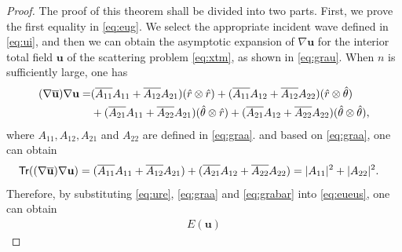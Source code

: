 \documentclass[11pt,reqno,twoside]{amsart}
\theoremstyle{definition}
\theoremstyle{remark}
\numberwithin{equation}{section}
\newcommand{\bu}{\mathbf{u}}
\newcommand{\bx}{\mathbf{x}}
\begin{document}
			\begin{proof}
				The proof of this theorem shall be divided into two parts.
				First, we prove the first equality in \eqref{eq:eug}.
				We select the appropriate incident wave defined in \eqref{eq:ui}, and then we can obtain the asymptotic expansion of $\nabla \bu$ for the interior total field $\bu$ of the scattering problem \eqref{eq:xtm}, as shown in \eqref{eq:grau}. When $n$ is sufficiently large, one has 
				\begin{align}\label{eq:graugrau}
					(\nabla \overline{\bu} )\nabla \bu
					=&(\overline{A_{11} }A_{11}+\overline{A_{12} }A_{21}) (\hat{r} \otimes \hat{r })+(\overline{A_{11} }A_{12}+\overline{A_{12} }A_{22} ) (\hat{r} \otimes \hat{\theta })\\
					&+(\overline{A_{21} }A_{11} +\overline{A_{22} }A_{21} )(\hat{\theta} \otimes \hat{r })+(\overline{A_{21} }A_{12} +\overline{A_{22} }A_{22})(\hat{\theta} \otimes \hat{\theta}),\notag
				\end{align}
				where $A_{11}, A_{12}, A_{21} $ and $A_{22}$ are defined in \eqref{eq:graa}. and based on \eqref{eq:graa}, one can obtain 
				\begin{align}\label{eq:grabar}
					&{\sf Tr}((\nabla \overline{\bu} )\nabla \bu)=(\overline{A_{11} }A_{11}+\overline{A_{12} }A_{21})+(\overline{A_{21} }A_{12} +\overline{A_{22} }A_{22})=|A_{11}|^{2}+|A_{22}|^{2}. 
				\end{align}
				Therefore, by substituting \eqref{eq:ure}, \eqref{eq:graa} and \eqref{eq:grabar} into \eqref{eq:eueus}, one can obtain 
				\begin{align}\label{eq:euz}
					E(\mathbf{u})

\end{align}
\end{proof}
\end{document}
